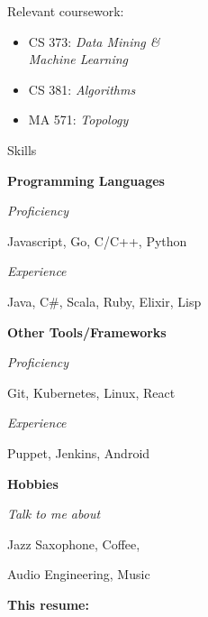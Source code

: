 \begin{minipage}[t]{0.305\textwidth}
\begin{adjustwidth}{10pt}{}
    Relevant coursework:
    \begin{itemize}[leftmargin=*]
    \item CS 373: \emph{Data Mining \&}\\\phantom{CS 373: }\emph{Machine Learning}
    \item CS 381: \emph{Algorithms}
    \item MA 571: \emph{Topology}
    \end{itemize}
  \end{adjustwidth}

  \vspace{10pt}

  {\sectionfont Skills}

  \vspace{5pt}
  \textbf{Programming Languages}
  \vspace{2pt}
  \begin{adjustwidth}{10pt}{}
    \emph{Proficiency}

    \quad Javascript, Go, C/C++, Python

    \emph{Experience}

    \quad Java, C\#, Scala, Ruby, Elixir, Lisp

  \end{adjustwidth}

  \vspace{5pt}
  \textbf{Other Tools/Frameworks}
  \vspace{2pt}
  \begin{adjustwidth}{10pt}{}
    \emph{Proficiency}

    \quad Git, Kubernetes, Linux, React

    \emph{Experience}

    \quad Puppet, Jenkins, Android
  \end{adjustwidth}

  \vspace{5pt}
  \textbf{Hobbies}
  \vspace{2pt}
  \begin{adjustwidth}{10pt}{}
    \emph{Talk to me about}

    \quad Jazz Saxophone, Coffee,

    \quad Audio Engineering, Music
  \end{adjustwidth}

  \vspace{20pt}

  \textbf{This resume:}\enspace



\end{minipage}
